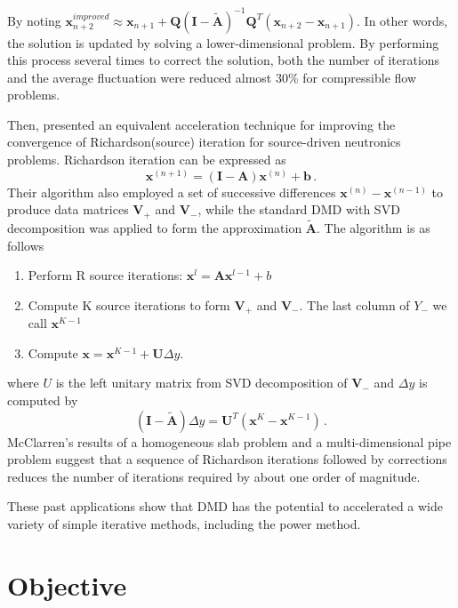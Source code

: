 By noting $\mathbf{x}^{improved}_{n+2} \approx \mathbf{x}_{n+1} + \mathbf{Q} \mathbf{(I-\tilde{A})}^{-1} \mathbf{Q}^T (\mathbf{x}_{n+2} - \mathbf{x}_{n+1})$.
In other words, the solution is updated by solving a lower-dimensional problem.
By performing this process several times to correct the solution, both the number of iterations and the average fluctuation were reduced almost 30\% for compressible flow problems. 

Then, \citet{mcclarren_acceleration_2018} presented an equivalent acceleration technique for improving the convergence of Richardson(source) iteration for source-driven neutronics problems.
Richardson iteration can be expressed as 
\begin{equation}
 \mathbf{x}^{(n+1)} = (\mathbf{I}-\mathbf{A})\mathbf{x}^{(n)} + \mathbf{b} \, .
 \label{eq:richardson}
\end{equation}
Their algorithm also employed a set of successive differences $\mathbf{x}^{(n)}-\mathbf{x}^{(n-1)}$ to produce data matrices $\mathbf{V}_+$ and $\mathbf{V}_-$, while the standard DMD with SVD decomposition was applied to form the approximation $\mathbf{\tilde{A}}$.
The algorithm is as follows
\begin{enumerate}
 \item Perform R source iterations: $\mathbf{x}^{l} = \mathbf{A} \mathbf{x}^{l-1} +b$
 \item Compute K source iterations to form $\mathbf{V}_+$ and $\mathbf{V}_-$. The last column of $Y_-$ we call $\mathbf{x}^{K-1}$ 
 \item Compute $\mathbf{x} = \mathbf{x}^{K-1} + \mathbf{U} \Delta y$.
\end{enumerate} 
where $U$ is the left unitary matrix from SVD decomposition of $\mathbf{V}_-$ and $\Delta y$ is computed by 
\begin{equation}
 (\mathbf{I} - \mathbf{\tilde{A}}) \Delta y = \mathbf{U}^T(\mathbf{x}^{K} - \mathbf{x}^{K-1})\, .
 \label{eq:McClarren}
\end{equation}
McClarren's results of a homogeneous slab problem and a multi-dimensional pipe problem suggest that a sequence of Richardson iterations followed by corrections reduces the number of iterations required by about one order of magnitude.

These past applications show that DMD has the potential to accelerated a wide variety of simple iterative methods, including the power method.

\section{Objective}

